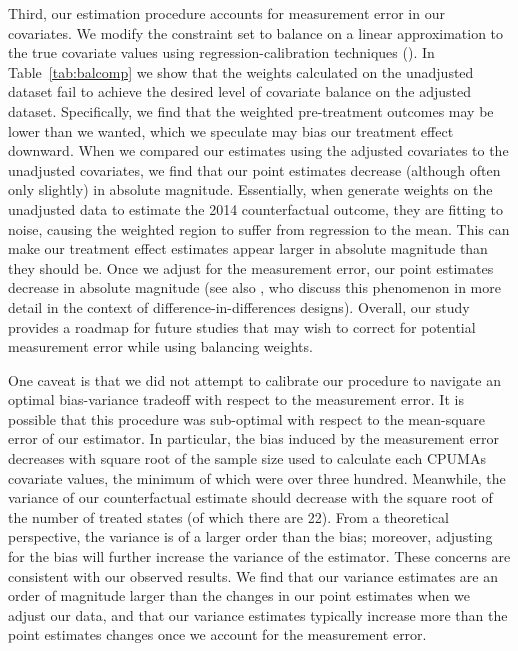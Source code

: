 Third, our estimation procedure accounts for measurement error in our covariates. We modify the constraint set to balance on a linear approximation to the true covariate values using regression-calibration techniques (\cite{gleser1992importance}). In Table~\ref{tab:balcomp} we show that the weights calculated on the unadjusted dataset fail to achieve the desired level of covariate balance on the adjusted dataset. Specifically, we find that the weighted pre-treatment outcomes may be lower than we wanted, which we speculate may bias our treatment effect downward. When we compared our estimates using the adjusted covariates to the unadjusted covariates, we find that our point estimates decrease (although often only slightly) in absolute magnitude. Essentially, when generate weights on the unadjusted data to estimate the 2014 counterfactual outcome, they are fitting to noise, causing the weighted region to suffer from regression to the mean. This can make our treatment effect estimates appear larger in absolute magnitude than they should be. Once we adjust for the measurement error, our point estimates decrease in absolute magnitude (see also \cite{daw2018matching}, who discuss this phenomenon in more detail in the context of difference-in-differences designs). Overall, our study provides a roadmap for future studies that may wish to correct for potential measurement error while using balancing weights. 

One caveat is that we did not attempt to calibrate our procedure to navigate an optimal bias-variance tradeoff with respect to the measurement error. It is possible that this procedure was sub-optimal with respect to the mean-square error of our estimator. In particular, the bias induced by the measurement error decreases with square root of the sample size used to calculate each CPUMAs covariate values, the minimum of which were over three hundred. Meanwhile, the variance of our counterfactual estimate should decrease with the square root of the number of treated states (of which there are 22). From a theoretical perspective, the variance is of a larger order than the bias; moreover, adjusting for the bias will further increase the variance of the estimator. These concerns are consistent with our observed results. We find that our variance estimates are an order of magnitude larger than the changes in our point estimates when we adjust our data, and that our variance estimates typically increase more than the point estimates changes once we account for the measurement error. 

